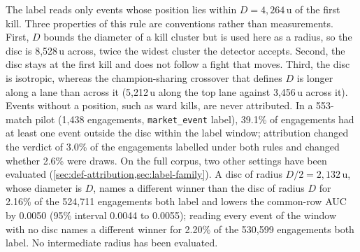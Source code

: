 The label reads only events whose position lies within $D = 4{,}264$\,u of the first kill.
Three properties of this rule are conventions rather than measurements. First, $D$ bounds the
diameter of a kill cluster but is used here as a radius, so the disc is 8,528\,u across, twice
the widest cluster the detector accepts. Second, the disc stays at the first kill and does not
follow a fight that moves. Third, the disc is isotropic, whereas the champion-sharing crossover
that defines $D$ is longer along a lane than across it (5,212\,u along the top lane against
3,456\,u across it).
Events without a position, such as ward kills, are never attributed. In a 553-match pilot
(1,438 engagements, \texttt{market\_event} label), 39.1\% of engagements had at least one event
outside the disc within the label window; attribution changed the verdict of 3.0\% of the
engagements labelled under both rules and changed whether 2.6\% were draws. On the full corpus, two other
settings have been evaluated (\cref{sec:def-attribution,sec:label-family}). A disc of radius
$D/2 = 2{,}132$\,u, whose diameter is $D$, names a different winner than the disc of radius $D$ for 2.16\%
of the 524,711 engagements both label and lowers the common-row AUC by 0.0050 (95\% interval 0.0044 to
0.0055); reading every event of the window with no disc names a different winner for 2.20\% of the 530,599
engagements both label. No intermediate radius has been evaluated.
